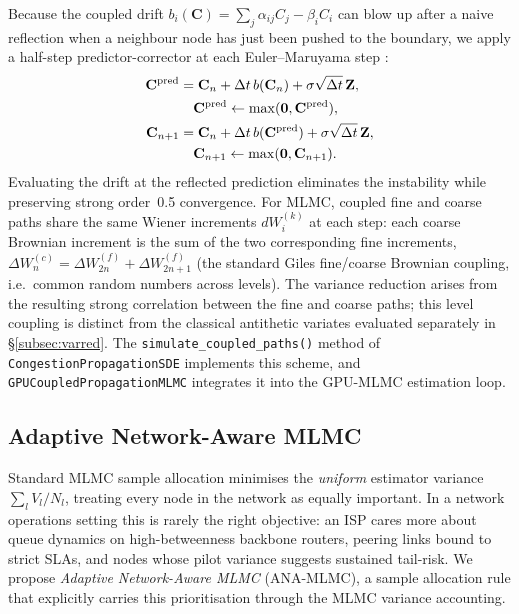 \documentclass{ieeeaccess}
\begin{document}
Because the coupled drift $b_i(\mathbf{C})=\sum_j\alpha_{ij}C_j-\beta_i C_i$ can blow up
after a naive reflection when a neighbour node has just been pushed to the boundary, we
apply a half-step predictor-corrector at each Euler--Maruyama step
\cite{asmussen2007stochastic,lions1984stochastic}:
\begin{align}
    \mathbf{C}^{\mathrm{pred}} &= \mathbf{C}_n + \Delta t\,b(\mathbf{C}_n) + \sigma\sqrt{\Delta t}\,\mathbf{Z},
    \notag\\
    &\quad \mathbf{C}^{\mathrm{pred}} \leftarrow \max(\mathbf{0},\mathbf{C}^{\mathrm{pred}}), \notag\\
    \mathbf{C}_{n+1} &= \mathbf{C}_n + \Delta t\,b(\mathbf{C}^{\mathrm{pred}}) + \sigma\sqrt{\Delta t}\,\mathbf{Z},
    \notag\\
    &\quad \mathbf{C}_{n+1} \leftarrow \max(\mathbf{0},\mathbf{C}_{n+1}). \label{eq:pc_reflection}
\end{align}
Evaluating the drift at the reflected prediction eliminates the instability while preserving
strong order~0.5 convergence. For MLMC, coupled fine and coarse paths share the same Wiener increments $dW_i^{(k)}$ at each
step: each coarse Brownian increment is the sum of the two corresponding fine increments,
$\Delta W^{(c)}_n = \Delta W^{(f)}_{2n} + \Delta W^{(f)}_{2n+1}$ (the standard Giles fine/coarse
Brownian coupling, i.e.\ common random numbers across levels). The variance reduction arises from
the resulting strong correlation between the fine and coarse paths; this level coupling is distinct
from the classical antithetic variates evaluated separately in \S\ref{subsec:varred}. The \texttt{simulate\_coupled\_paths()} method of \texttt{CongestionPropagationSDE}
implements this scheme, and \texttt{GPUCoupledPropagationMLMC} integrates it into the
GPU-MLMC estimation loop.

\subsection{Adaptive Network-Aware MLMC}
\label{subsec:ana_mlmc}

Standard MLMC sample allocation \cite{giles2015multilevel} minimises the \emph{uniform}
estimator variance $\sum_l V_l/N_l$, treating every node in the network as equally important. In
a network operations setting this is rarely the right objective: an ISP cares more about queue
dynamics on high-betweenness backbone routers, peering links bound to strict SLAs, and nodes
whose pilot variance suggests sustained tail-risk. We propose \emph{Adaptive Network-Aware MLMC}
(ANA-MLMC), a sample allocation rule that explicitly carries this prioritisation through the
MLMC variance accounting.
\end{document}
